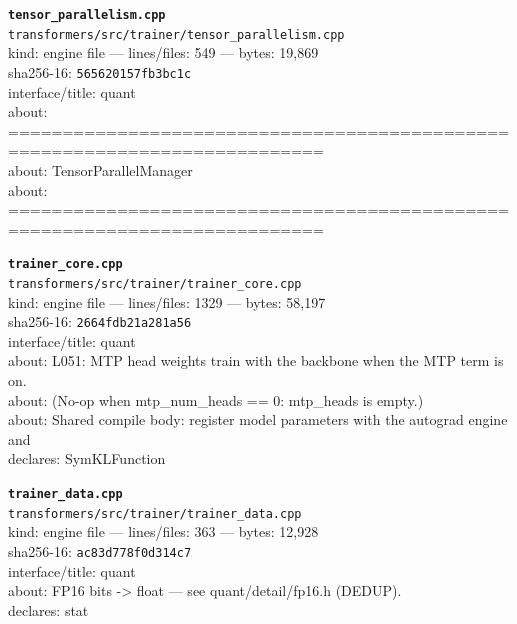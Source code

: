 \noindent\textbf{\texttt{tensor\_parallelism.cpp}}\\
\texttt{transformers/src/trainer/tensor\_parallelism.cpp}\\
kind: engine file --- lines/files: 549 --- bytes: 19,869\\
sha256-16: \texttt{565620157fb3bc1c}\\
interface/title: quant\\
about: ===========================================================================\\
about: TensorParallelManager\\
about: ===========================================================================\\
\vspace*{6.0pt}

\noindent\textbf{\texttt{trainer\_core.cpp}}\\
\texttt{transformers/src/trainer/trainer\_core.cpp}\\
kind: engine file --- lines/files: 1329 --- bytes: 58,197\\
sha256-16: \texttt{2664fdb21a281a56}\\
interface/title: quant\\
about: L051: MTP head weights train with the backbone when the MTP term is on.\\
about: (No-op when mtp\_num\_heads == 0: mtp\_heads is empty.)\\
about: Shared compile body: register model parameters with the autograd engine and\\
declares: SymKLFunction\\
\vspace*{6.0pt}

\noindent\textbf{\texttt{trainer\_data.cpp}}\\
\texttt{transformers/src/trainer/trainer\_data.cpp}\\
kind: engine file --- lines/files: 363 --- bytes: 12,928\\
sha256-16: \texttt{ac83d778f0d314c7}\\
interface/title: quant\\
about: FP16 bits -> float — see quant/detail/fp16.h (DEDUP).\\
declares: stat\\
\vspace*{6.0pt}
\newpage

